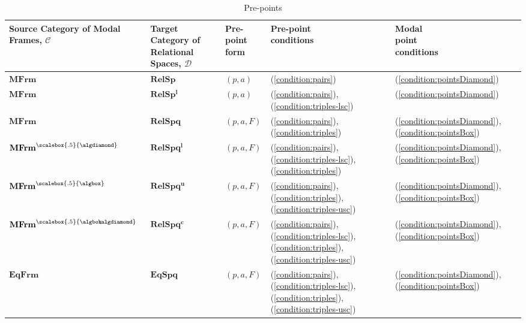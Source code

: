 \documentclass{article}[a4paper]
\theoremstyle{definition}
\newcommand{\Ccal}{\mathcal{C}} %
\newcommand{\Dcal}{\mathcal{D}} %
\newcommand{\topcat}{\mathbf{Top}}
\newcommand{\rels}{\mathbf{RelS}}
\newcommand{\relsp}{\mathbf{RelSp}}
\newcommand{\relspl}{\mathbf{RelSp^l}}
\newcommand{\relspq}{\mathbf{RelSpq}}
\newcommand{\relspqu}{\mathbf{RelSpq^u}}
\newcommand{\relspql}{\mathbf{RelSpq^l}}
\newcommand{\relspqc}{\mathbf{RelSpq^c}}
\newcommand{\eqspq}{\mathbf{EqSpq}}
\newcommand{\frm}{\mathbf{Frm}}
\newcommand{\mfrm}{\mathbf{MFrm}}
\newcommand{\mfrms}{\mathbf{MFrm}^{\scalebox{.5}{\algbox\!\!\!\algdiamond}}}
\newcommand{\mfrmbs}{\mathbf{MFrm}^{\scalebox{.5}{\algbox}}}
\newcommand{\mfrmds}{\mathbf{MFrm}^{\scalebox{.5}{\algdiamond}}}
\newcommand{\eqfrm}{\mathbf{EqFrm}}
\DeclareMathOperator{\pt}{\mathrm{pt}}
\begin{document}
\begin{table}[ht]
    \centering
    \begin{tabular}{|l|l|l|l|l|}
        \hline
       \makecell[lt]{Source\\Category\\ of\\Modal\\Frames,\\$\Ccal$} 
       & 
       \makecell[lt]{Target\\Category\\of\\Relational\\Spaces,\\$\Dcal$}  
       & 
       \makecell[lt]{Pre-point\\form} 
       & 
       \makecell[lt]{Pre-point\\ conditions}  
       &
       \makecell[lt]{Modal\\point\\conditions}
       \\ 
       \hline
       $\mfrm$ & $\relsp$  & $(p,a)$ & (\ref{condition:pairs})
       &
       (\ref{condition:pointsDiamond})
       \\
        $\mfrm$ & $\relspl$  & $(p,a)$ & (\ref{condition:pairs}),(\ref{condition:triples-lsc})
        & 
        (\ref{condition:pointsDiamond})
        \\
       $\mfrm$ & $\relspq$ & $(p,a,F)$ & (\ref{condition:pairs}),(\ref{condition:triples})
       &
       (\ref{condition:pointsDiamond}),
       (\ref{condition:pointsBox})
       \\
       $\mfrmds$ & $\relspql$ & $(p,a,F)$ & (\ref{condition:pairs}),(\ref{condition:triples-lsc}),(\ref{condition:triples})
       &
       (\ref{condition:pointsDiamond}),
       (\ref{condition:pointsBox})
       \\
       $\mfrmbs$ & $\relspqu$ & $(p,a,F)$ & 
       (\ref{condition:pairs}),(\ref{condition:triples}),(\ref{condition:triples-usc})
       &
       (\ref{condition:pointsDiamond}),
       (\ref{condition:pointsBox})
       \\
       $\mfrms$ & $\relspqc$ & $(p,a,F)$ & 
        (\ref{condition:pairs}),(\ref{condition:triples-lsc}),(\ref{condition:triples}),(\ref{condition:triples-usc})
        &
       (\ref{condition:pointsDiamond}),
       (\ref{condition:pointsBox})
        \\
       $\eqfrm$ & $\eqspq$ & $(p,a,F)$ 
       & 
       (\ref{condition:pairs}),(\ref{condition:triples-lsc}),(\ref{condition:triples}),(\ref{condition:triples-usc})
       &
       (\ref{condition:pointsDiamond}),
       (\ref{condition:pointsBox})
       \\ \hline
    \end{tabular}
    \caption{Pre-points}
    \label{table:pre-points}
\end{table}
\end{document}
